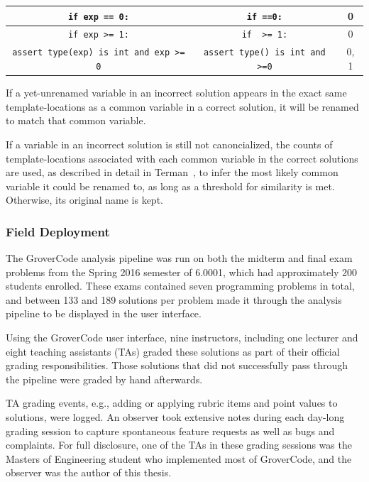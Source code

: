 \begin{table}
\begin{tabular}{|c|c|c|}
\hline
\texttt{if exp == 0:} & \texttt{if \underline{\hspace{1em}}==0:} & 0 \\
\hline
\texttt{if exp >= 1:} & \texttt{if \underline{\hspace{1em}} >= 1:} & 0 \\
\hline
\texttt{assert type(exp) is int and exp >= 0} & \texttt{assert type(\underline{\hspace{1em}}) is int and \underline{\hspace{1em}}>=0} & 0, 1 \\
\hline
\end{tabular}
\label{table:template-location}
\end{table}

If a yet-unrenamed variable in an incorrect solution appears in the exact same template-locations as a common variable in a correct solution, it will be renamed to match that common variable.

If a variable in an incorrect solution is still not canoncialized, the counts of template-locations associated with each common variable in the correct solutions are used, as described in detail in Terman~\cite{staceythesis}, to infer the most likely common variable it could be renamed to, as long as a threshold for similarity is met. Otherwise, its original name is kept. 

\subsubsection{Field Deployment}

The GroverCode analysis pipeline was run on both the midterm and final exam problems from the Spring 2016 semester of 6.0001, which had approximately 200 students enrolled. These exams contained seven programming problems in total, and between 133 and 189 solutions per problem made it through the analysis pipeline to be displayed in the user interface. 

Using the GroverCode user interface, nine instructors, including one lecturer and eight teaching assistants (TAs) graded these solutions as part of their official grading responsibilities. Those solutions that did not successfully pass through the pipeline were graded by hand afterwards.

TA grading events, e.g., adding or applying rubric items and point values to solutions, were logged. An observer took extensive notes during each day-long grading session to capture spontaneous feature requests as well as bugs and complaints. For full disclosure, one of the TAs in these grading sessions was the Masters of Engineering student who implemented most of GroverCode, and the observer was the author of this thesis.

